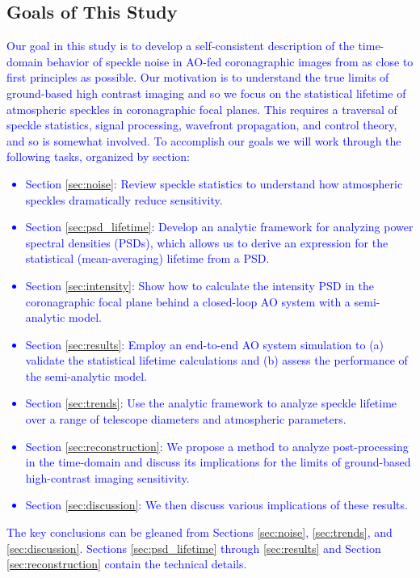 \documentclass[10pt,preprint]{aastex631}
\newcommand{\jrmadd}[1]{\textcolor{blue}{#1}}
\begin{document}
\subsection{Goals of This Study}
\jrmadd{Our goal in this study is to develop a self-consistent description of the time-domain behavior of speckle noise in AO-fed coronagraphic images from as close to first principles as possible.  Our motivation is to understand the true limits of ground-based high contrast imaging and so we focus on the statistical lifetime of atmospheric speckles in coronagraphic focal planes.   This requires a traversal of speckle statistics, signal processing, wavefront propagation, and control theory, and so is somewhat involved. To accomplish our goals we will work through the following tasks, organized by section:
\begin{itemize}
\item Section \ref{sec:noise}: Review speckle statistics to understand how atmospheric speckles dramatically reduce sensitivity.
\item Section \ref{sec:psd_lifetime}: Develop an analytic framework for analyzing power spectral densities (PSDs), which allows us to derive an expression for the statistical (mean-averaging) lifetime from a PSD.
\item Section \ref{sec:intensity}: Show how to calculate the intensity PSD in the coronagraphic focal plane behind a closed-loop AO system with a semi-analytic model.
\item Section \ref{sec:results}: Employ an end-to-end AO system simulation to (a) validate the statistical lifetime calculations and (b) assess the performance of the semi-analytic model.
\item Section \ref{sec:trends}: Use the analytic framework to analyze speckle lifetime over a range of telescope diameters and atmospheric parameters.
\item Section \ref{sec:reconstruction}: We propose a method to analyze post-processing in the time-domain and discuss its implications for the limits of ground-based high-contrast imaging sensitivity.
\item Section \ref{sec:discussion}: We then discuss various implications of these results.
\end{itemize}
The key conclusions can be gleaned from Sections \ref{sec:noise}, \ref{sec:trends}, and \ref{sec:discussion}. Sections \ref{sec:psd_lifetime} through \ref{sec:results} and Section \ref{sec:reconstruction} contain the technical details.  }
\end{document}
